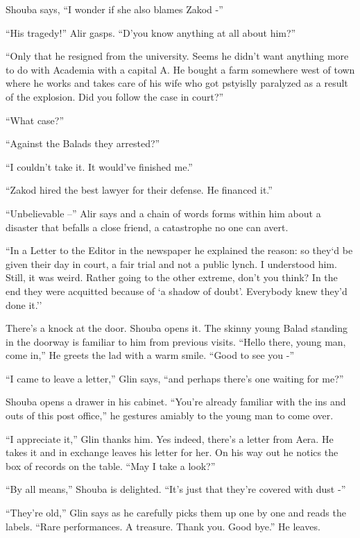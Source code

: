 \documentclass[twoside,11pt]{book}
\begin{document}
Shouba says, ``I wonder if she also blames Zakod -''

``His tragedy!'' Alir gasps. ``D'you know anything at all about
him?''

``Only that he resigned from the university. Seems he didn't want anything more to do with Academia with a
capital A. He bought a farm somewhere west of town where he works and takes care of his wife who got pstyislly
paralyzed as a result of the explosion. Did you follow the case in court?''

``What case?''

``Against the Balads they arrested?''

``I couldn't take it. It would've finished me.''

``Zakod hired the best lawyer for their defense. He financed it.''

``Unbelievable --'' Alir says and a chain of words forms within him about a disaster that
befalls a close friend, a catastrophe no one can avert.

``In a Letter to the Editor in the newspaper he explained the reason: so they`d be given their day in
court, a fair trial and not a public lynch. I understood him. Still, it was weird. Rather going to the other extreme,
don't you think? In the end they were acquitted because of `a shadow of
doubt'. Everybody knew they'd done it.''

There's a knock at the door. Shouba opens it. The skinny young Balad standing in the doorway is familiar to him from
previous visits. ``Hello there, young man, come in,'' He greets the lad with a warm smile.
``Good to see you -''

``I came to leave a letter,'' Glin says, ``and perhaps there's one waiting for
me?''

Shouba opens a drawer in his cabinet. ``You're already familiar with the ins and outs of this post
office,'' he gestures amiably to the young man to come over.

``I appreciate it,'' Glin thanks him. Yes indeed, there's a letter from Aera. He takes it and
in exchange leaves his letter for her. On his way out he notics the box of records on the table. ``May I
take a look?''

``By all means,'' Shouba is delighted. ``It's just that they're covered with dust
-''

``They're old,'' Glin says as he carefully picks them up one by one and reads the labels.
``Rare performances. A treasure. Thank you. Good bye.'' He leaves.
\end{document}
